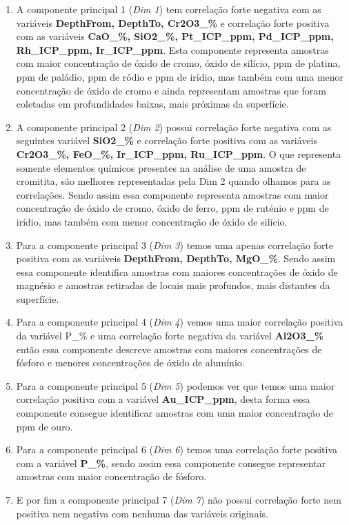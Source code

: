 \documentclass[
]{article}
\begin{document}
\begin{enumerate}
\def\labelenumi{\arabic{enumi}.}
\item
  A componente principal 1 (\emph{Dim 1}) tem correlação forte negativa com as variáveis \textbf{DepthFrom, DepthTo, Cr2O3\_\%} e correlação forte positiva com as variáveis \textbf{CaO\_\%, SiO2\_\%, Pt\_ICP\_ppm, Pd\_ICP\_ppm, Rh\_ICP\_ppm, Ir\_ICP\_ppm}. Esta componente representa amostras com maior concentração de óxido de cromo, óxido de silício, ppm de platina, ppm de paládio, ppm de ródio e ppm de irídio, mas também com uma menor concentração de óxido de cromo e ainda representam amostras que foram coletadas em profundidades baixas, mais próximas da superfície.
\item
  A componente principal 2 (\emph{Dim 2}) possui correlação forte negativa com as seguintes variável \textbf{SiO2\_\%} e correlação forte positiva com as variáveis \textbf{Cr2O3\_\%, FeO\_\%, Ir\_ICP\_ppm, Ru\_ICP\_ppm}. O que representa somente elementos químicos presentes na análise de uma amostra de cromitita, são melhores representadas pela Dim 2 quando olhamos para as correlações. Sendo assim essa componente representa amostras com maior concentração de óxido de cromo, óxido de ferro, ppm de ruténio e ppm de irídio, mas também com menor concentração de óxido de silício.
\item
  Para a componente principal 3 (\emph{Dim 3}) temos uma apenas correlação forte positiva com as variáveis \textbf{DepthFrom, DepthTo, MgO\_\%}. Sendo assim essa componente identifica amostras com maiores concentrações de óxido de magnésio e amostras retiradas de locais mais profundos, mais distantes da superfície.
\item
  Para a componente principal 4 (\emph{Dim 4}) vemos uma maior correlação positiva da variável P\_\% e uma correlação forte negativa da variável \textbf{Al2O3\_\%} então essa componente descreve amostras com maiores concentrações de fósforo e menores concentrações de óxido de alumínio.
\item
  Para a componente principal 5 (\emph{Dim 5}) podemos ver que temos uma maior correlação positiva com a variável \textbf{Au\_ICP\_ppm}, desta forma essa componente consegue identificar amostras com uma maior concentração de ppm de ouro.
\item
  Para a componente principal 6 (\emph{Dim 6}) temos uma correlação forte positiva com a variável \textbf{P\_\%}, sendo assim essa componente consegue representar amostras com maior concentração de fósforo.
\item
  E por fim a componente principal 7 (\emph{Dim 7}) não possui correlação forte nem positiva nem negativa com nenhuma das variáveis originais.
\end{enumerate}
\end{document}
